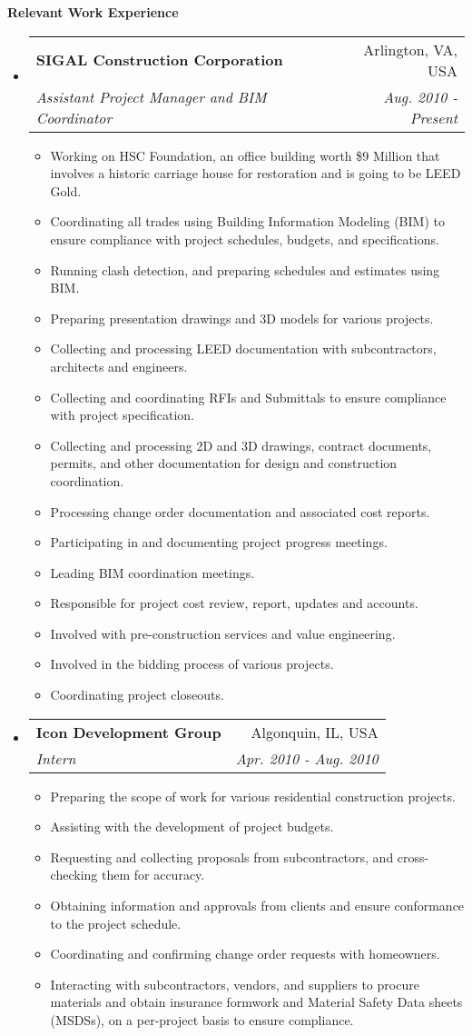 \documentclass[letterpaper,10pt]{article}
\makeatletter
\newcommand{\resitem}[1]{\item #1}
\newcommand{\resheading}[1]{{\large \colorbox{mygrey}{\vspace{0.6in} \begin{minipage}{\textwidth}{\textbf{#1 \vphantom{p\^{E}}}}\end{minipage}}}}
\newcommand{\ressubheading}[4]{
\begin{tabular*}{7in}{l@{\extracolsep{\fill}}r}
		\textbf{#1} & #2 \\
		\textit{#3} & \textit{#4} \\
\end{tabular*}}
\makeatother
\begin{document}
\resheading{Relevant Work Experience}
\begin{itemize}

\item
  \ressubheading{SIGAL Construction Corporation}{Arlington, VA, USA}{Assistant Project Manager and BIM Coordinator}{Aug. 2010 - Present}
  \begin{itemize}
    \resitem{Working on HSC Foundation, an office building worth \$9 Million that involves a historic carriage house for restoration and is going to be LEED Gold.}
    \resitem{Coordinating all trades using Building Information Modeling (BIM) to ensure compliance with project schedules, budgets, and specifications.}
    \resitem{Running clash detection, and preparing schedules and estimates using BIM.}
    \resitem{Preparing presentation drawings and 3D models for various projects.}
    \resitem{Collecting and processing LEED documentation with subcontractors, architects and engineers.}
    \resitem{Collecting and coordinating RFIs and Submittals to ensure compliance with project specification.}
    \resitem{Collecting and processing 2D and 3D drawings, contract documents, permits, and other documentation for design and construction coordination.}
    \resitem{Processing change order documentation and associated cost reports.}
    \resitem{Participating in and documenting project progress meetings.}
    \resitem{Leading BIM coordination meetings.}
    \resitem{Responsible for project cost review, report, updates and accounts.}
    \resitem{Involved with pre-construction services and value engineering.}
    \resitem{Involved in the bidding process of various projects.}
    \resitem{Coordinating project closeouts.}
  \end{itemize}
\item
  \ressubheading{Icon Development Group}{Algonquin, IL, USA}{Intern}{Apr. 2010 - Aug. 2010}
  \begin{itemize}
   \resitem{Preparing the scope of work for various residential construction projects.}
   \resitem{Assisting with the development of project budgets.}
   \resitem{Requesting and collecting proposals from subcontractors, and cross-checking them for accuracy.}
   \resitem{Obtaining information and approvals from clients and ensure conformance to the project schedule.}
   \resitem{Coordinating and confirming change order requests with homeowners.}
   \resitem{Interacting with subcontractors, vendors, and suppliers to procure materials and obtain insurance formwork and Material Safety Data sheets (MSDSs), on a per-project basis to ensure compliance.}


\end{itemize}
\end{itemize}
\end{document}
